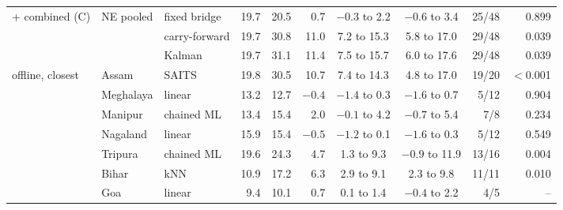 \begin{table}[t]
\begin{tabular}{lll rrr cc rr}
\midrule
+ combined (C) & NE pooled & fixed bridge & 19.7 & 20.5 & 0.7 & $-0.3$ to 2.2 & $-0.6$ to 3.4 & 25/48 & 0.899 \\
 &  & carry-forward & 19.7 & 30.8 & 11.0 & 7.2 to 15.3 & 5.8 to 17.0 & 29/48 & 0.039 \\
 &  & Kalman & 19.7 & 31.1 & 11.4 & 7.5 to 15.7 & 6.0 to 17.6 & 29/48 & 0.039 \\
\midrule
offline, closest & Assam & SAITS & 19.8 & 30.5 & 10.7 & 7.4 to 14.3 & 4.8 to 17.0 & 19/20 & $<$0.001 \\
 & Meghalaya & linear & 13.2 & 12.7 & $-0.4$ & $-1.4$ to 0.3 & $-1.6$ to 0.7 & 5/12 & 0.904 \\
 & Manipur & chained ML & 13.4 & 15.4 & 2.0 & $-0.1$ to 4.2 & $-0.7$ to 5.4 & 7/8 & 0.234 \\
 & Nagaland & linear & 15.9 & 15.4 & $-0.5$ & $-1.2$ to 0.1 & $-1.6$ to 0.3 & 5/12 & 0.549 \\
 & Tripura & chained ML & 19.6 & 24.3 & 4.7 & 1.3 to 9.3 & $-0.9$ to 11.9 & 13/16 & 0.004 \\
 & Bihar & kNN & 10.9 & 17.2 & 6.3 & 2.9 to 9.1 & 2.3 to 9.8 & 11/11 & 0.010 \\
 & Goa & linear & 9.4 & 10.1 & 0.7 & 0.1 to 1.4 & $-0.4$ to 2.2 & 4/5 & -- \\
\bottomrule
\end{tabular}
\end{table}
